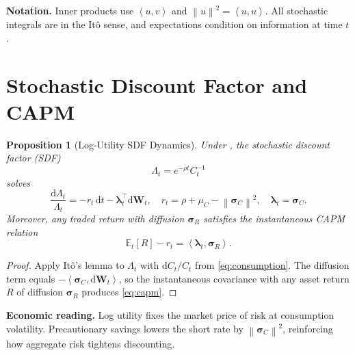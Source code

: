 \documentclass[11pt,letterpaper]{article}
\theoremstyle{plain}
\newtheorem{propositionT}{Proposition}
\theoremstyle{definition}
\newenvironment{proposition}[2]{\begin{propositionT}[#1]\label{prop:#2}}{\end{propositionT}}
\newcommand{\E}{\mathbb{E}}
\newcommand{\diff}{\mathrm{d}}
\newcommand{\norm}[1]{\left\lVert #1 \right\rVert}
\newcommand{\ip}[2]{\left\langle #1, #2 \right\rangle}
\begin{document}
\begin{tcolorbox}[mathstyle]
\textbf{Notation.} Inner products use $\ip{u}{v}$ and $\norm{u}^2 = \ip{u}{u}$. All stochastic integrals are in the It\^o sense, and expectations condition on information at time $t$.
\end{tcolorbox}

\section{Stochastic Discount Factor and CAPM}\label{sec:sdf}
\begin{proposition}{Log-Utility SDF Dynamics}{sdf}
Under , the stochastic discount factor (SDF)
\begin{equation}\label{eq:sdf}
  \Lambda_t = e^{-\rho t} C_t^{-1}
\end{equation}
solves
\begin{equation}\label{eq:sdf_drift}
  \frac{\diff \Lambda_t}{\Lambda_t} = -r_t\, \diff t - \bm{\lambda}_t^{\top} \diff \bm{W}_t,
  \quad r_t = \rho + \mu_C - \norm{\bm{\sigma}_C}^2,
  \quad \bm{\lambda}_t = \bm{\sigma}_C.
\end{equation}
Moreover, any traded return with diffusion $\bm{\sigma}_R$ satisfies the instantaneous CAPM relation
\begin{equation}\label{eq:capm}
  \E_t[R] - r_t = \ip{\bm{\lambda}_t}{\bm{\sigma}_R}.
\end{equation}
\end{proposition}
\begin{proof}
Apply It\^o's lemma to $\Lambda_t$ with $\diff C_t/C_t$ from \eqref{eq:consumption}. The diffusion term equals $-\ip{\bm{\sigma}_C}{\diff \bm{W}_t}$, so the instantaneous covariance with any asset return $R$ of diffusion $\bm{\sigma}_R$ produces \eqref{eq:capm}.
\end{proof}

\begin{tcolorbox}[didacticstyle]
\textbf{Economic reading.} Log utility fixes the market price of risk at consumption volatility. Precautionary savings lowers the short rate by $\norm{\bm{\sigma}_C}^2$, reinforcing how aggregate risk tightens discounting.
\end{tcolorbox}

\end{document}
